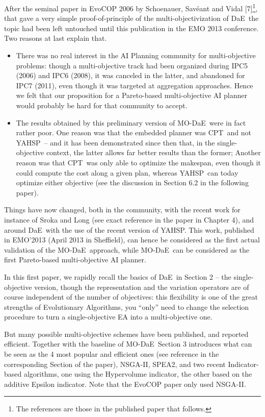 \documentclass[english]{DESCARWINreport}
\newcounter{con}
\def\DAE{{\sc DaE}}
\def\YAHSP{{\sc YAHSP}}
\def\CPT{{\sc CPT}}
\def\MODAE{{\sc MO-DaE}}
\begin{document}
After the seminal paper in EvoCOP 2006 by Schoenauer, Savéant and Vidal [7]\footnote{The references are those in the published paper that follows.}, that gave a very simple proof-of-principle of the multi-objectivization of \DAE\, the topic had been left untouched until this publication in the EMO 2013 conference. Two reasons at last explain that.
\begin{itemize}
 \item There was no real interest in the AI Planning community for multi-objective problems: though a multi-objective track had been organized during IPC5 (2006) and IPC6 (2008), it was canceled in the latter, and abandoned for IPC7 (2011), even though it was targeted at aggregation approaches. Hence we felt that our proposition for a Pareto-based multi-objective AI planner would probably be hard for that community to accept.
 \item The results obtained by this preliminary version of \MODAE\ were in fact rather poor. One reason was that the embedded planner was \CPT\ and not \YAHSP\ -- and it has been demonstrated since then that, in the single-objective context, the latter allows far better results than the former; Another reason was that \CPT\ was only able to optimize the makespan, even though it could compute the cost along a given plan, whereas \YAHSP\ can today optimize either objective (see the discussion in Section 6.2 in the following paper).
\end{itemize}

Things have now changed, both in the community, with the recent work for instance of Sroka and Long (see exact reference in the paper in Chapter 4), and around \DAE\, with the use of the recent version of \YAHSP. This work, published in EMO'2013 (April 2013 in Sheffield), can hence be considered as the first actual validation of the \MODAE\ approach, while \MODAE\ can be considered as the first Pareto-based multi-objective AI planner.

In this first paper, we rapidly recall the basics of \DAE\ in Section 2 -- the single-objective version, though the representation and the variation operators are of course independent of the number of objectives: this flexibility is one of the great strengths of Evolutionary Algorithms, you ``only'' need to change the selection procedure to turn a single-objective EA into a multi-objective one.

But many possible multi-objective schemes have been published, and reported efficient. Together with the baseline of \MODAE\, Section 3 introduces what can be seen as the 4 most popular and efficient ones (see reference in the corresponding Section of the paper), NSGA-II, SPEA2, and two recent Indicator-based algorithms, one using the Hypervolume indicator, the other based on the additive Epsilon indicator. Note that the EvoCOP paper only used NSGA-II.
\end{document}
